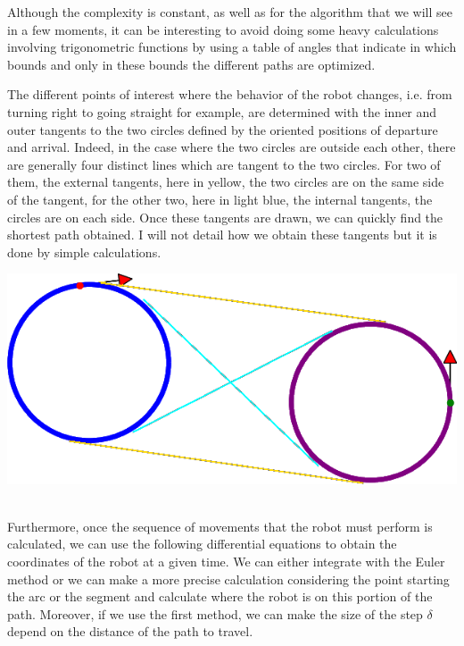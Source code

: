 \documentclass[11pt,a4paper]{article}
\begin{document}
	Although the complexity is constant, as well as for the algorithm that we will see in a few moments, it can be interesting to avoid doing some heavy calculations involving trigonometric functions by using a table of angles that indicate in which bounds and only in these bounds the different paths are optimized.\\
	
	\begin{minipage}{0.8\textwidth}
	\raggedright
	The different points of interest where the behavior of the robot changes, i.e. from turning right to going straight for example, are determined with the inner and outer tangents to the two circles defined by the oriented positions of departure and arrival. Indeed, in the case where the two circles are outside each other, there are generally four distinct lines which are tangent to the two circles. For two of them, the external tangents, here in yellow, the two circles are on the same side of the tangent, for the other two, here in light blue, the internal tangents, the circles are on each side. Once these tangents are drawn, we can quickly find the shortest path obtained. I will not detail how we obtain these tangents but it is done by simple calculations.
	\end{minipage}
	\begin{minipage}{0.2\textwidth}
	\includegraphics[width=\linewidth]{Illustrations/001tangentsSummary.png}
	\end{minipage}\\
	
	Furthermore, once the sequence of movements that the robot must perform is calculated, we can use the following differential equations to obtain the coordinates of the robot at a given time. We can either integrate with the Euler method or we can make a more precise calculation considering the point starting the arc or the segment and calculate where the robot is on this portion of the path. Moreover, if we use the first method, we can make the size of the step $\delta$ depend on the distance of the path to travel.
	
\end{document}
